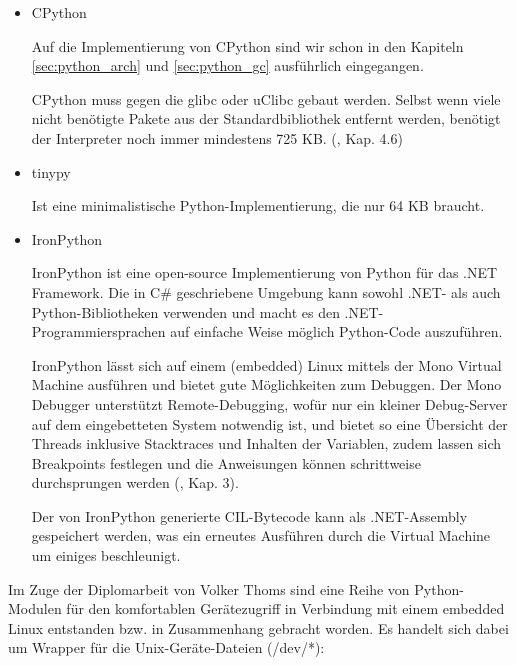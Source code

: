\begin{itemize}

  \item CPython

        Auf die Implementierung von CPython sind wir schon in den Kapiteln
        \ref{sec:python_arch} und \ref{sec:python_gc} ausführlich eingegangen.

        CPython muss gegen die glibc oder uClibc gebaut werden. Selbst wenn
        viele nicht benötigte Pakete aus der Standardbibliothek entfernt
        werden, benötigt der Interpreter noch immer mindestens 725 KB.
        (\cite{embeddedlinux}, Kap. 4.6)

  \item tinypy

        Ist eine minimalistische Python-Implementierung, die nur 64 KB braucht.\cite{tinypy}
  \item IronPython

        IronPython ist eine open-source Implementierung von Python für das
        .NET Framework. Die in C\# geschriebene Umgebung kann sowohl .NET-
        als auch Python-Bibliotheken verwenden und macht es den
        .NET-Programmiersprachen auf einfache Weise möglich Python-Code
        auszuführen.

        IronPython lässt sich auf einem (embedded) Linux mittels der Mono
        Virtual Machine ausführen und bietet gute Möglichkeiten zum Debuggen.
        Der Mono Debugger unterstützt Remote-Debugging, wofür nur ein kleiner
        Debug-Server auf dem eingebetteten System notwendig ist, und bietet so
        eine Übersicht der Threads inklusive Stacktraces und Inhalten der
        Variablen, zudem lassen sich Breakpoints festlegen und die Anweisungen
        können schrittweise durchsprungen werden (\cite{ironpython}, Kap. 3).

        Der von IronPython generierte CIL-Bytecode kann als .NET-Assembly
        gespeichert werden, was ein erneutes Ausführen durch die Virtual
        Machine um einiges beschleunigt.

\end{itemize}


Im Zuge der Diplomarbeit von Volker Thoms \cite{dipl} sind eine Reihe von
Python-Modulen für den komfortablen Gerätezugriff in Verbindung mit einem
embedded Linux entstanden bzw. in Zusammenhang gebracht worden. Es handelt sich dabei
um Wrapper für die Unix-Geräte-Dateien (/dev/*):


